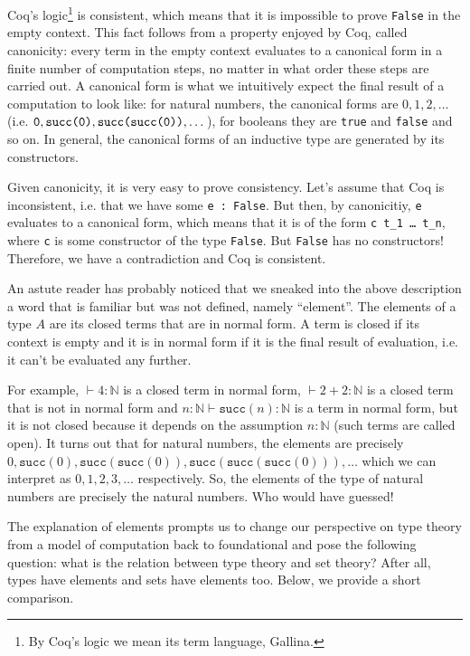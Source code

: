 \documentclass[declaration,mgr,english,shortabstract]{iithesis}
\newcommand{\m}[1]{\texttt{#1}}
\newcommand{\term}[3]{#1 \vdash #2 : #3}
\newcommand{\N}{\mathbb{N}}
\newcommand{\suc}[1]{\m{succ}(#1)}
\begin{document}
Coq's logic\footnote{By Coq's logic we mean its term language, Gallina.} is consistent, which means that it is impossible to prove \m{False} in the empty context. This fact follows from a property enjoyed by Coq, called canonicity: every term in the empty context evaluates to a canonical form in a finite number of computation steps, no matter in what order these steps are carried out. A canonical form is what we intuitively expect the final result of a computation to look like: for natural numbers, the canonical forms are $0, 1, 2, \dots$ (i.e. $\m{0}, \m{\suc{0}}, \m{\suc{\suc{0}}}, \dots$), for booleans they are \m{true} and \m{false} and so on. In general, the canonical forms of an inductive type are generated by its constructors.

Given canonicity, it is very easy to prove consistency. Let's assume that Coq is inconsistent, i.e. that we have some \m{e :\ False}. But then, by canonicitiy, \m{e} evaluates to a canonical form, which means that it is of the form \m{c t\_1\ \dots\ t\_n}, where \m{c} is some constructor of the type \m{False}. But \m{False} has no constructors! Therefore, we have a contradiction and Coq is consistent.



An astute reader has probably noticed that we sneaked into the above description a word that is familiar but was not defined, namely ``element''. The elements of a type $A$ are its closed terms that are in normal form. A term is closed if its context is empty and it is in normal form if it is the final result of evaluation, i.e. it can't be evaluated any further.

For example, $\term{}{4}{\N}$ is a closed term in normal form, $\term{}{2 + 2}{\N}$ is a closed term that is not in normal form and $\term{n : \N}{\suc{n}}{\N}$ is a term in normal form, but it is not closed because it depends on the assumption $n : \N$ (such terms are called open). It turns out that for natural numbers, the elements are precisely $0, \suc{0}, \suc{\suc{0}}, \suc{\suc{\suc{0}}}, \dots$ which we can interpret as $0, 1, 2, 3, \dots$ respectively. So, the elements of the type of natural numbers are precisely the natural numbers. Who would have guessed!

The explanation of elements prompts us to change our perspective on type theory from a model of computation back to foundational and pose the following question: what is the relation between type theory and set theory? After all, types have elements and sets have elements too. Below, we provide a short comparison.
\end{document}
